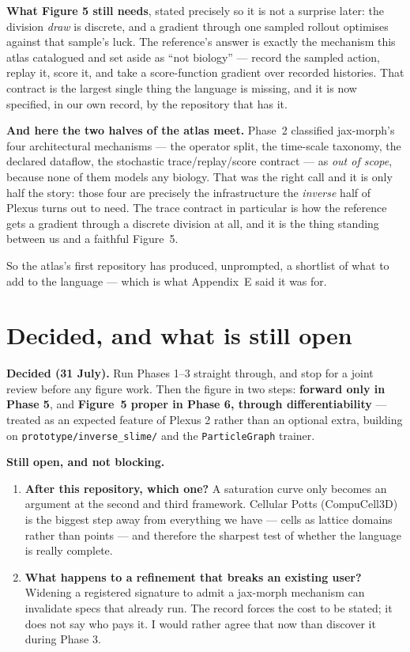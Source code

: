 \documentclass[11pt,a4paper]{article}
\newcommand{\code}[1]{\texttt{#1}}
\begin{document}
\textbf{What Figure 5 still needs}, stated precisely so it is not a surprise later: the division
\emph{draw} is discrete, and a gradient through one sampled rollout optimises against that
sample's luck. The reference's answer is exactly the mechanism this atlas catalogued and set aside
as ``not biology'' --- record the sampled action, replay it, score it, and take a score-function
gradient over recorded histories. That contract is the largest single thing the language is
missing, and it is now specified, in our own record, by the repository that has it.

\textbf{And here the two halves of the atlas meet.} Phase~2 classified jax-morph's four
architectural mechanisms --- the operator split, the time-scale taxonomy, the declared dataflow,
the stochastic trace/replay/score contract --- as \emph{out of scope}, because none of them models
any biology. That was the right call and it is only half the story: those four are precisely the
infrastructure the \emph{inverse} half of Plexus turns out to need. The trace contract in
particular is how the reference gets a gradient through a discrete division at all, and it is the
thing standing between us and a faithful Figure~5.

So the atlas's first repository has produced, unprompted, a shortlist of what to add to the
language --- which is what Appendix~E said it was for.

\section{Decided, and what is still open}

\textbf{Decided (31 July).} Run Phases 1--3 straight through, and stop for a joint review before
any figure work. Then the figure in two steps: \textbf{forward only in Phase 5}, and
\textbf{Figure~5 proper in Phase 6, through differentiability} --- treated as an expected feature
of Plexus 2 rather than an optional extra, building on \code{prototype/inverse\_slime/} and the
\code{ParticleGraph} trainer.

\textbf{Still open, and not blocking.}

\begin{enumerate}[leftmargin=1.4em]
\item \textbf{After this repository, which one?} A saturation curve only becomes an argument at
the second and third framework. Cellular Potts (CompuCell3D) is the biggest step away from
everything we have --- cells as lattice domains rather than points --- and therefore the sharpest
test of whether the language is really complete.
\item \textbf{What happens to a refinement that breaks an existing user?} Widening a registered
signature to admit a jax-morph mechanism can invalidate specs that already run. The record forces
the cost to be stated; it does not say who pays it. I would rather agree that now than discover it
during Phase 3.
\end{enumerate}
\end{document}
